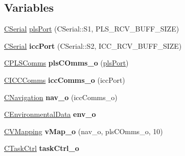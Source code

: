 \subsection*{Variables}
\begin{DoxyCompactItemize}
\item 
\mbox{\hyperlink{class_c_serial}{C\+Serial}} \mbox{\hyperlink{_a_d_a_s___nav_u_8ino_a5427ed2b254fc7bb97bb9c8b92af7d60}{pls\+Port}} (C\+Serial\+::\+S1, P\+L\+S\+\_\+\+R\+C\+V\+\_\+\+B\+U\+F\+F\+\_\+\+S\+I\+ZE)
\item 
\mbox{\label{_a_d_a_s___nav_u_8ino_ad1e6d9fed4369104e412a46c019634d2}} 
\mbox{\hyperlink{class_c_serial}{C\+Serial}} {\bfseries icc\+Port} (C\+Serial\+::\+S2, I\+C\+C\+\_\+\+R\+C\+V\+\_\+\+B\+U\+F\+F\+\_\+\+S\+I\+ZE)
\item 
\mbox{\label{_a_d_a_s___nav_u_8ino_add0df3806d74ba741b1d6bc5452d7e79}} 
\mbox{\hyperlink{class_c_p_l_s_comms}{C\+P\+L\+S\+Comms}} {\bfseries pls\+C\+Omms\+\_\+o} (\mbox{\hyperlink{_a_d_a_s___nav_u_8ino_a5427ed2b254fc7bb97bb9c8b92af7d60}{pls\+Port}})
\item 
\mbox{\label{_a_d_a_s___nav_u_8ino_a62ef6b3308259edb69af585549178324}} 
\mbox{\hyperlink{class_c_i_c_c_comms}{C\+I\+C\+C\+Comms}} {\bfseries icc\+Comms\+\_\+o} (icc\+Port)
\item 
\mbox{\label{_a_d_a_s___nav_u_8ino_a8abc3c3b0c6950fd83525420d5ca0dd2}} 
\mbox{\hyperlink{class_c_navigation}{C\+Navigation}} {\bfseries nav\+\_\+o} (icc\+Comms\+\_\+o)
\item 
\mbox{\label{_a_d_a_s___nav_u_8ino_a6c839a9b171c9b833a61a0d7612e2da8}} 
\mbox{\hyperlink{class_c_environmental_data}{C\+Environmental\+Data}} {\bfseries env\+\_\+o}
\item 
\mbox{\label{_a_d_a_s___nav_u_8ino_a7ce4fc0ae24a704f84deb379a8f515a3}} 
\mbox{\hyperlink{class_c_v_mapping}{C\+V\+Mapping}} {\bfseries v\+Map\+\_\+o} (nav\+\_\+o, pls\+C\+Omms\+\_\+o, 10)
\item 
\mbox{\label{_a_d_a_s___nav_u_8ino_a4e98d90206033e0ef6b58d0d11930bac}} 
\mbox{\hyperlink{class_c_task_ctrl}{C\+Task\+Ctrl}} {\bfseries task\+Ctrl\+\_\+o}
\end{DoxyCompactItemize}


